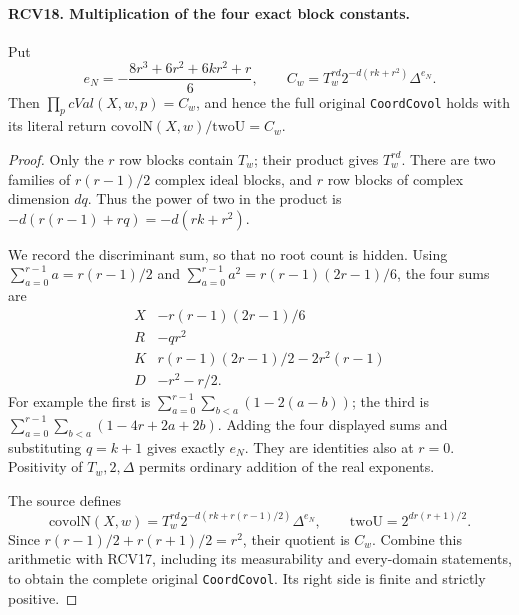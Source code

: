 \documentclass[11pt,a4paper]{article}
\numberwithin{equation}{section}
\theoremstyle{remark}\newtheorem{remark}[theorem]{Remark}
\begin{document}
\paragraph{RCV18. Multiplication of the four exact block constants.}
\label{claim:RCV18}
Put
\[
 e_N=-\frac{8r^3+6r^2+6kr^2+r}{6},\qquad
 C_w=T_w^{rd}2^{-d(rk+r^2)}\Delta^{e_N}.
\tag{RCV.32}
\]
Then \(\prod_p cVal(X,w,p)=C_w\), and hence the full
original \texttt{Coord\allowbreak Covol} holds with its literal return
\(\mathrm{covolN}(X,w)/\mathrm{twoU}=C_w\).
\begin{proof}
Only the \(r\) row blocks contain \(T_w\); their product gives
\(T_w^{rd}\).  There are two families of \(r(r-1)/2\)
complex ideal blocks, and \(r\) row blocks of complex dimension
\(dq\).  Thus the power of two in the product is
\(-d(r(r-1)+rq)=-d(rk+r^2)\).

We record the discriminant sum, so that no root count is hidden.
Using \(\sum_{a=0}^{r-1}a=r(r-1)/2\) and
\(\sum_{a=0}^{r-1}a^2=r(r-1)(2r-1)/6\), the four sums are
\[
\begin{array}{c|c}
 X&-r(r-1)(2r-1)/6\\
 R&-qr^2\\
 K&r(r-1)(2r-1)/2-2r^2(r-1)\\
 D&-r^2-r/2.
\end{array}
\tag{RCV.33}
\]
For example the first is
\(\sum_{a=0}^{r-1}\sum_{b<a}(1-2(a-b))\); the third is
\(\sum_{a=0}^{r-1}\sum_{b<a}(1-4r+2a+2b)\).
Adding the four displayed sums and substituting \(q=k+1\)
gives exactly \(e_N\).  They are identities also at \(r=0\).
Positivity of \(T_w,2,\Delta\) permits ordinary addition of
the real exponents.

The source defines
\[
 \mathrm{covolN}(X,w)
 =T_w^{rd}2^{-d(rk+r(r-1)/2)}\Delta^{e_N},\qquad
 \mathrm{twoU}=2^{dr(r+1)/2}.
\]
Since \(r(r-1)/2+r(r+1)/2=r^2\), their quotient is \(C_w\).
Combine this arithmetic with RCV17, including its measurability
and every-domain statements, to obtain the complete original
\texttt{Coord\allowbreak Covol}.  Its right side is finite and strictly positive.
\end{proof}

\end{document}
